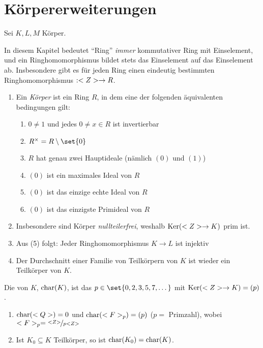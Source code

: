 \section{Körpererweiterungen}

Sei $K,L,M$ Körper.

\begin{remark}
	In diesem Kapitel bedeutet ``Ring'' \emph{immer} kommutativer Ring mit Einselement, und ein Ringhomomorphismus bildet stets das Einselement auf das Einselement ab.
	Insbesondere gibt es für jeden Ring einen eindeutig bestimmten Ringhomomorphismus $: <Z> \to R$.
\end{remark}

\begin{remark}
	\begin{enumerate}[label=(\alph*)]
		\item Ein \emph{Körper} ist ein Ring $R$, in dem eine der folgenden äquivalenten bedingungen gilt:
		\begin{enumerate}[label=\arabic*)]
			\item $0 \neq 1$ und jedes $0 \neq x \in R$ ist invertierbar
			\item $R^{\times} = R \setminus \set{0}$
			\item $R$ hat genau zwei Hauptideale (nämlich $(0)$ und $(1)$)
			\item $(0)$ ist ein maximales Ideal von $R$
			\item $(0)$ ist das einzige echte Ideal von $R$
			\item $(0)$ ist das einzigste Primideal von $R$
		\end{enumerate}
		\item Insbesondere sind Körper \emph{nullteilerfrei}, weshalb $\operatorname{Ker}(<Z> \to K)$ prim ist.
		\item Aus (5) folgt: Jeder Ringhomomorphismus $K \to L$ ist injektiv %
		\item Der Durchschnitt einer Familie von Teilkörpern von $K$ ist wieder ein Teilkörper von $K$.
	\end{enumerate}
\end{remark}

\begin{definition}[Charakteristik]
	Die  von $K$, $\operatorname{char}(K)$, ist das $p \in \set{0,2,3,5,7, \dots}$ mit $\operatorname{Ker}(<Z> \to K) = (p)$.
\end{definition}

\begin{example}
	\begin{enumerate}
		\item $\operatorname{char}(<Q>) = 0$ und $\operatorname{char}(<F>_p) = (p)$ ($p =$ Primzahl), wobei $\Fp = \lnkset{\Z}{p\Z}$
		\item Ist $K_0 \subseteq K$ Teilkörper, so ist $\operatorname{char}(K_0) = \operatorname{char}(K)$.
	\end{enumerate}
\end{example}

